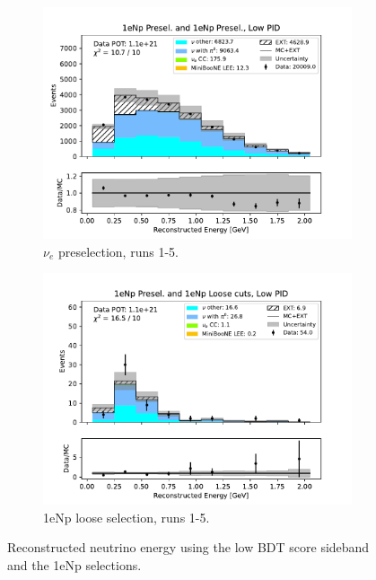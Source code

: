 \begin{figure}[H]
\begin{subfigure}{0.5\linewidth}
        \includegraphics[width=\linewidth]{technote/Sidebands/Figures/FarSideband/far_sideband_reco_e_run1234b4c4d5_NP_NP_LOW_PID.pdf}
        \caption{$\nu_e$ preselection, runs 1-5.}
    \end{subfigure}%
    \begin{subfigure}{0.5\linewidth}
        \includegraphics[width=\linewidth]{technote/Sidebands/Figures/FarSideband/far_sideband_reco_e_run1234b4c4d5_NP_NPL_LOW_PID.pdf}
        \caption{1eNp loose selection, runs 1-5.}
    \end{subfigure}
    \caption{Reconstructed neutrino energy using the low BDT score sideband and the 1eNp selections.}
\end{figure}

